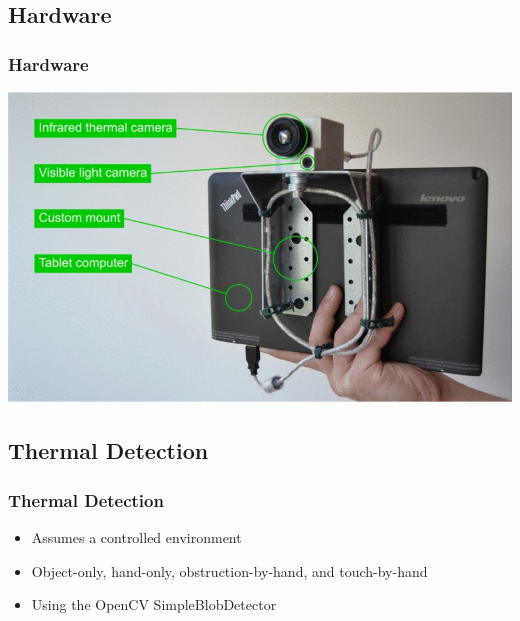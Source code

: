\documentclass{beamer}
\begin{document}
\subsection{Hardware}
\begin{frame}
\frametitle{Hardware}	
	\includegraphics[width=\textwidth]{../Sample_paper/images/Hardware2}
	\begin{center}
	\cite{Thermal}
	\end{center}
\end{frame}

\subsection{Thermal Detection}
\begin{frame}
\frametitle{Thermal Detection}
	\begin{itemize}
		\item Assumes a controlled environment
		\item Object-only, hand-only, obstruction-by-hand, and touch-by-hand
		\item Using the OpenCV SimpleBlobDetector
	\end{itemize}
\end{frame}
\end{document}
